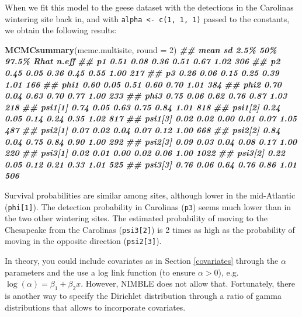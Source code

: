\documentclass[
  12pt,
]{krantz}
\newenvironment{Shaded}{\begin{snugshade}}{\end{snugshade}}
\newcommand{\AttributeTok}[1]{\textcolor[rgb]{0.13,0.29,0.53}{#1}}
\newcommand{\DecValTok}[1]{\textcolor[rgb]{0.00,0.00,0.81}{#1}}
\newcommand{\DocumentationTok}[1]{\textcolor[rgb]{0.56,0.35,0.01}{\textbf{\textit{#1}}}}
\newcommand{\FunctionTok}[1]{\textcolor[rgb]{0.13,0.29,0.53}{\textbf{#1}}}
\newcommand{\NormalTok}[1]{#1}
\begin{document}
When we fit this model to the geese dataset with the detections in the Carolinas wintering site back in, and with \texttt{alpha\ \textless{}-\ c(1,\ 1,\ 1)} passed to the constants, we obtain the following results:

\begin{Shaded}
\begin{Highlighting}[]
\FunctionTok{MCMCsummary}\NormalTok{(mcmc.multisite, }\AttributeTok{round =} \DecValTok{2}\NormalTok{)}
\DocumentationTok{\#\#         mean   sd 2.5\%  50\% 97.5\% Rhat n.eff}
\DocumentationTok{\#\# p1      0.51 0.08 0.36 0.51  0.67 1.02   306}
\DocumentationTok{\#\# p2      0.45 0.05 0.36 0.45  0.55 1.00   217}
\DocumentationTok{\#\# p3      0.26 0.06 0.15 0.25  0.39 1.01   166}
\DocumentationTok{\#\# phi1    0.60 0.05 0.51 0.60  0.70 1.01   384}
\DocumentationTok{\#\# phi2    0.70 0.04 0.63 0.70  0.77 1.00   233}
\DocumentationTok{\#\# phi3    0.75 0.06 0.62 0.76  0.87 1.03   218}
\DocumentationTok{\#\# psi1[1] 0.74 0.05 0.63 0.75  0.84 1.01   818}
\DocumentationTok{\#\# psi1[2] 0.24 0.05 0.14 0.24  0.35 1.02   817}
\DocumentationTok{\#\# psi1[3] 0.02 0.02 0.00 0.01  0.07 1.05   487}
\DocumentationTok{\#\# psi2[1] 0.07 0.02 0.04 0.07  0.12 1.00   668}
\DocumentationTok{\#\# psi2[2] 0.84 0.04 0.75 0.84  0.90 1.00   292}
\DocumentationTok{\#\# psi2[3] 0.09 0.03 0.04 0.08  0.17 1.00   220}
\DocumentationTok{\#\# psi3[1] 0.02 0.01 0.00 0.02  0.06 1.00  1022}
\DocumentationTok{\#\# psi3[2] 0.22 0.05 0.12 0.21  0.33 1.01   525}
\DocumentationTok{\#\# psi3[3] 0.76 0.06 0.64 0.76  0.86 1.01   506}
\end{Highlighting}
\end{Shaded}

Survival probabilities are similar among sites, although lower in the mid-Atlantic (\texttt{phi{[}1{]}}). The detection probability in Carolinas (\texttt{p3}) seems much lower than in the two other wintering sites. The estimated probability of moving to the Chesapeake from the Carolinas (\texttt{psi3{[}2{]}}) is 2 times as high as the probability of moving in the opposite direction (\texttt{psi2{[}3{]}}).

In theory, you could include covariates as in Section \ref{covariates} through the \(\alpha\) parameters and the use a log link function (to ensure \(\alpha > 0\)), e.g.~\(\log(\alpha) = \beta_1 + \beta_2 x\). However, NIMBLE does not allow that. Fortunately, there is another way to specify the Dirichlet distribution through a ratio of gamma distributions that allows to incorporate covariates.
\end{document}
